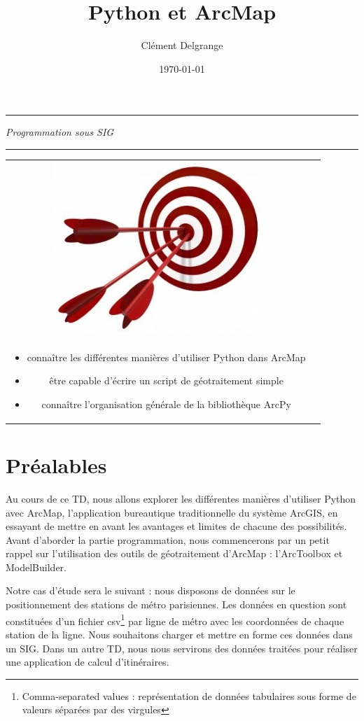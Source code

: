 \documentclass[11pt]{article}
\title{Python et ArcMap}
\author{Clément Delgrange}
\date{\today}
\newenvironment{objectifs}{
	\begin{lrbox}{\mybox}
		\begin{minipage}{0.9\textwidth}
			\vspace{1em}
			\begin{tabular}[t t]{c c}
				\includegraphics[width=0.1\linewidth]{img/goals.jpg} &
				\begin{minipage}[c]{0.8\linewidth}
					\hspace{2em}\textbf{\large{Objectifs :}} \\
}{
				\end{minipage}
			\end{tabular}
			\vspace{1em}
		\end{minipage}
	\end{lrbox}
	\fbox{\usebox{\mybox}}
}
\begin{document}
\parindent=0cm

\makeatletter
\begin{center}
	\hrule
	\vspace{1em}
	{\small \textit{Programmation sous SIG}}\\	
	\vspace{0.5em}
	{\Large \bfseries{\@title}}
	\vspace{1em}
	\hrule
\end{center}
\makeatother


\begin{objectifs}
\begin{itemize}
	\item connaître les différentes manières d'utiliser Python dans ArcMap
	\item être capable d'écrire un script de géotraitement simple
	\item connaître l'organisation générale de la bibliothèque ArcPy
\end{itemize}
\end{objectifs}




\section*{Préalables}
Au cours de ce TD, nous allons explorer les différentes manières d'utiliser Python avec ArcMap, l'application bureautique traditionnelle du système ArcGIS, en essayant de mettre en avant les avantages et limites de chacune des possibilités. Avant d'aborder la partie programmation, nous commencerons par un petit rappel sur l'utilisation des outils de géotraitement d'ArcMap : l'ArcToolbox et ModelBuilder.


Notre cas d'étude sera le suivant : nous disposons de données sur le positionnement des stations de métro parisiennes. Les données en question sont constituées d'un fichier csv\footnote{Comma-separated values : représentation de données tabulaires sous forme de valeurs séparées par des virgules} par ligne de métro avec les coordonnées de chaque station de la ligne. Nous souhaitons charger et mettre en forme ces données dans un SIG. Dans un autre TD, nous nous servirons des données traitées pour réaliser une application de calcul d'itinéraires. 
\end{document}
